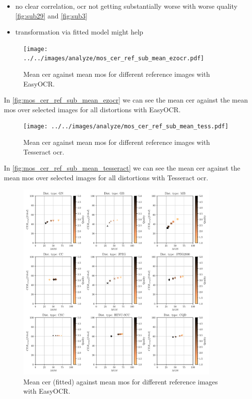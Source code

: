 \begin{itemize}
\item no clear correlation, ocr not getting substantially worse with worse quality \autoref{fig:sub29} and \autoref{fig:sub3}
\item transformation via fitted model might help
\end{itemize}

\begin{figure}[h]
\centering
    \texttt{[image: ../../images/analyze/mos\_cer\_ref\_sub\_mean\_ezocr.pdf]}
    \caption{Mean \gls{cer} against mean \gls{mos} for different reference images with EasyOCR.}
\label{fig:mos_cer_ref_sub_mean_ezocr}
\end{figure}

In \autoref{fig:mos_cer_ref_sub_mean_ezocr} we can see the mean \gls{cer} against the mean \gls{mos} over selected images for all distortions with EasyOCR.

\begin{figure}[h]
\centering
    \texttt{[image: ../../images/analyze/mos\_cer\_ref\_sub\_mean\_tess.pdf]}
    \caption{Mean \gls{cer} against mean \gls{mos} for different reference images with Tesseract \gls{ocr}.}
\label{fig:mos_cer_ref_sub_mean_tesseract}
\end{figure}

In \autoref{fig:mos_cer_ref_sub_mean_tesseract} we can see the mean \gls{cer} against the mean \gls{mos} over selected images for all distortions with Tesseract \gls{ocr}.


\begin{figure}[h]
\centering
    \includegraphics[width=0.9\textwidth]{../../images/analyze/mos_cer_ref_fitted_sub_mean_ezocr.pdf}
    \caption{Mean \gls{cer} (fitted) against mean \gls{mos} for different reference images with EasyOCR.}
\label{fig:mos_cer_ref_fitted_sub_mean_ezocr}
\end{figure}

